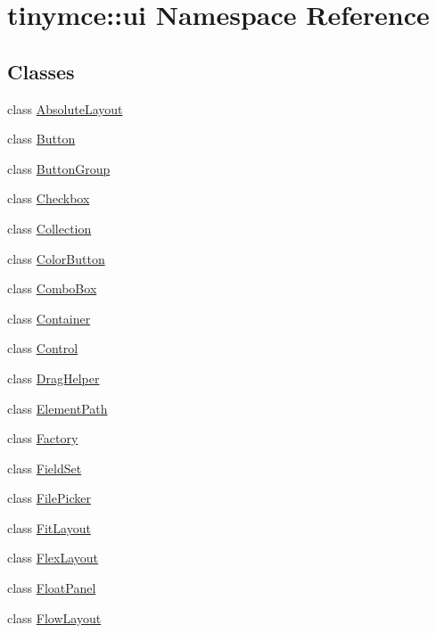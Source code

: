 \hypertarget{namespacetinymce_1_1ui}{\section{tinymce\+:\+:ui Namespace Reference}
\label{namespacetinymce_1_1ui}
}
\subsection*{Classes}
\begin{DoxyCompactItemize}
\item 
class \hyperlink{classtinymce_1_1ui_1_1_absolute_layout}{Absolute\+Layout}
\item 
class \hyperlink{classtinymce_1_1ui_1_1_button}{Button}
\item 
class \hyperlink{classtinymce_1_1ui_1_1_button_group}{Button\+Group}
\item 
class \hyperlink{classtinymce_1_1ui_1_1_checkbox}{Checkbox}
\item 
class \hyperlink{classtinymce_1_1ui_1_1_collection}{Collection}
\item 
class \hyperlink{classtinymce_1_1ui_1_1_color_button}{Color\+Button}
\item 
class \hyperlink{classtinymce_1_1ui_1_1_combo_box}{Combo\+Box}
\item 
class \hyperlink{classtinymce_1_1ui_1_1_container}{Container}
\item 
class \hyperlink{classtinymce_1_1ui_1_1_control}{Control}
\item 
class \hyperlink{classtinymce_1_1ui_1_1_drag_helper}{Drag\+Helper}
\item 
class \hyperlink{classtinymce_1_1ui_1_1_element_path}{Element\+Path}
\item 
class \hyperlink{classtinymce_1_1ui_1_1_factory}{Factory}
\item 
class \hyperlink{classtinymce_1_1ui_1_1_field_set}{Field\+Set}
\item 
class \hyperlink{classtinymce_1_1ui_1_1_file_picker}{File\+Picker}
\item 
class \hyperlink{classtinymce_1_1ui_1_1_fit_layout}{Fit\+Layout}
\item 
class \hyperlink{classtinymce_1_1ui_1_1_flex_layout}{Flex\+Layout}
\item 
class \hyperlink{classtinymce_1_1ui_1_1_float_panel}{Float\+Panel}
\item 
class \hyperlink{classtinymce_1_1ui_1_1_flow_layout}{Flow\+Layout}
\item 

\end{DoxyCompactItemize}
